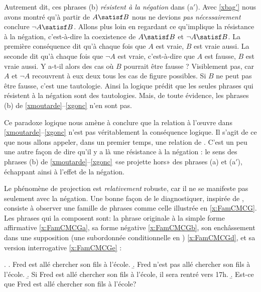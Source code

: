 \begin{refsegment}
Autrement dit, ces phrases (b) \emph{résistent à la négation} dans (a$'$).  
Avec \ref{xbag'}   nous avons montré qu'à partir de $A\satisf B$ nous ne devions
\emph{pas nécessairement} conclure $\neg A\satisf B$. 
Allons plus loin en regardant ce qu'implique la résistance à la négation, c'est-à-dire la coexistence de $A\satisf B$ et $\neg A\satisf B$.  
La première conséquence dit qu'à chaque fois que $A$ est vraie, $B$ est vraie aussi.  La seconde dit qu'à chaque fois que $\neg A$ est vraie, c'est-à-dire que $A$ est fausse, $B$ est vraie aussi.  Y a-t-il alors des cas où $B$ pourrait être fausse ?  Visiblement pas, car $A$ et $\neg A$ recouvrent à eux deux tous les cas de figure possibles.  Si $B$ ne peut pas être fausse, c'est une tautologie.  
Ainsi la logique prédit que les seules phrases qui résistent à la négation sont des tautologies.  Mais, de toute évidence, les phrases (b) de \ref{xmoutarde}--\ref{xgonc} n'en sont pas.

Ce paradoxe logique nous amène à conclure que la relation à l'\oe uvre dans  \ref{xmoutarde}--\ref{xgonc} n'est pas véritablement la conséquence logique.  Il s'agit de ce que nous allons appeler, dans un premier temps, une relation de .
C'est un peu une autre façon de dire qu'il y a là une résistance à la négation :  le sens des phrases (b) de \ref{xmoutarde}--\ref{xgonc} «se projette hors» des phrases (a) et  (a$'$), échappant ainsi à l'effet de la négation.

Le phénomène de projection est \emph{relativement} robuste, car il ne se manifeste pas seulement avec la négation. 
Une bonne façon de le diagnostiquer, inspirée de \citet[23--27]{ChierchiaMcCG:90}, consiste à observer une famille de phrases comme celle illustrée en \ref{x:FamCMCG}. 
Les phrases qui la composent sont: la phrase originale à la simple forme affirmative \ref{x:FamCMCGa}, sa forme négative \ref{x:FamCMCGb}, son enchâssement dans une supposition (une subordonnée conditionnelle en ) \ref{x:FamCMCGd}, et sa version interrogative \ref{x:FamCMCGe} :


\ex. \label{x:FamCMCG}
\a. Fred est allé chercher son fils à l'école. \label{x:FamCMCGa}
\b. Fred n'est pas allé chercher son fils à l'école. \label{x:FamCMCGb}
\b. Si Fred est allé chercher son fils à l'école, il sera rentré vers 17h.\label{x:FamCMCGd}
\b. Est-ce que Fred est allé chercher son fils à l'école?\label{x:FamCMCGe}



\end{refsegment}
